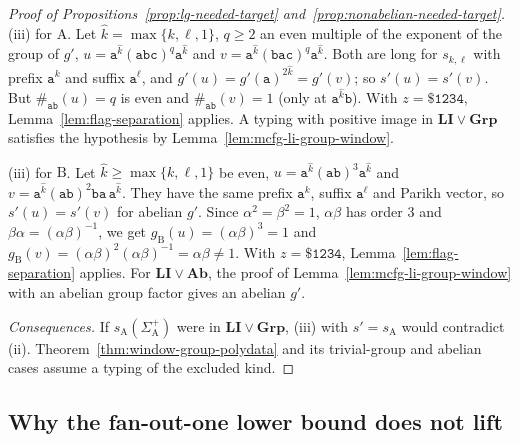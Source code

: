 \documentclass[11pt]{article}
\numberwithin{equation}{section}
\theoremstyle{plain}
\theoremstyle{definition}
\theoremstyle{remark}
\begin{document}
\begin{proof}[Proof of Propositions~\ref{prop:lg-needed-target}
and~\ref{prop:nonabelian-needed-target}]
(iii) for $\mathrm A$.  Let $\hat k=\max\{k,\ell,1\}$, $q\ge2$ an even multiple of the
exponent of the group of $g'$, $u=\mathtt a^{\hat k}(\mathtt{abc})^q\mathtt a^{\hat k}$
and $v=\mathtt a^{\hat k}(\mathtt{bac})^q\mathtt a^{\hat k}$.  Both are long for
$s_{k,\ell}$ with prefix $\mathtt a^k$ and suffix $\mathtt a^\ell$, and
$g'(u)=g'(\mathtt a)^{2\hat k}=g'(v)$; so $s'(u)=s'(v)$.  But $\#_{\mathtt{ab}}(u)=q$ is
even and $\#_{\mathtt{ab}}(v)=1$ (only at $\mathtt a^{\hat k}\mathtt b$).  With
$z=\mathtt{\$1234}$, Lemma~\ref{lem:flag-separation} applies.  A typing with positive
image in $\mathbf{LI}\vee\mathbf{Grp}$ satisfies the hypothesis by
Lemma~\ref{lem:mcfg-li-group-window}.

(iii) for $\mathrm B$.  Let $\hat k\ge\max\{k,\ell,1\}$ be even,
$u=\mathtt a^{\hat k}(\mathtt{ab})^3\mathtt a^{\hat k}$ and
$v=\mathtt a^{\hat k}(\mathtt{ab})^2\mathtt{ba}\,\mathtt a^{\hat k}$.  They have the same
prefix $\mathtt a^k$, suffix $\mathtt a^\ell$ and Parikh vector, so $s'(u)=s'(v)$ for abelian
$g'$.  Since $\alpha^2=\beta^2=1$, $\alpha\beta$ has order $3$ and
$\beta\alpha=(\alpha\beta)^{-1}$, we get $g_{\mathrm B}(u)=(\alpha\beta)^3=1$ and
$g_{\mathrm B}(v)=(\alpha\beta)^2(\alpha\beta)^{-1}=\alpha\beta\ne1$.  With
$z=\mathtt{\$1234}$, Lemma~\ref{lem:flag-separation} applies.  For
$\mathbf{LI}\vee\mathbf{Ab}$, the proof of Lemma~\ref{lem:mcfg-li-group-window} with
an abelian group factor gives an abelian $g'$.

\emph{Consequences.}  If $s_{\mathrm A}(\Sigma_{\mathrm A}^+)$ were in
$\mathbf{LI}\vee\mathbf{Grp}$, (iii) with $s'=s_{\mathrm A}$ would contradict (ii).
Theorem~\ref{thm:window-group-polydata} and its trivial-group and abelian cases
assume a typing of the excluded kind.
\end{proof}

\subsection{Why the fan-out-one lower bound does not lift}
\label{subsec:power-transfer}
\end{document}
